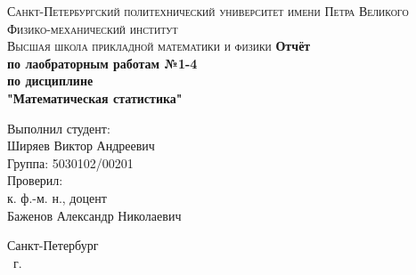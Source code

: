 \begin{titlepage}
    \begin{center}
        \textsc{
            Санкт-Петербургский политехнический университет имени Петра Великого \\ [5mm]
            Физико-механический институт\\[2mm]
            Высшая школа прикладной математики и физики            
        }   
        \vfill
        \textbf{\large
            Отчёт \\ по лаобраторным работам №1-4 \\ по дисциплине \\ "Математическая статистика"
        }                
    \end{center}

    \vfill
    \hfill
    \begin{minipage}{0.5\textwidth}
        Выполнил студент: \\ [2mm]   
        Ширяев Виктор Андреевич \\
        Группа: 5030102/00201 \\ [5mm]
        Проверил: \\ [2mm]
        к. ф.-м. н., доцент \\   
        Баженов Александр Николаевич
    \end{minipage}
    
    \vfill
    \begin{center}
        Санкт-Петербург\\
        \the\year\ г.
    \end{center}
\end{titlepage}